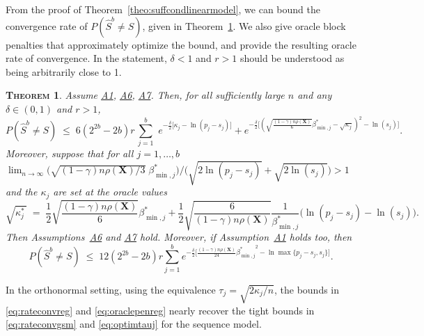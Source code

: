 \documentclass[bj,authoryear]{imsart}
\theoremstyle{plain}
\newtheorem{thm}{\textsc{Theorem}}[section]
\newcommand{\david}[1]{{\small{\color{blue} \sf $\heartsuit$ [David: #1]}}}
\newcommand{\paul}[1]{{\small{\color{green} \sf $\spadesuit$ Paul: #1}}}
\newcommand{\bs}{\boldsymbol}
\begin{document}
From the proof of Theorem~\ref{theo:suffcondlinearmodel}, we can bound the convergence rate of $P(\hat S^{b}\neq S)$, given in Theorem~\ref{prop:fullrecovreg}. We also give oracle block penalties that approximately optimize the bound, and provide the resulting oracle rate of convergence. 
In the statement, $\delta<1$ and $r>1$ should be understood as being arbitrarily close to 1. 
\begin{thm}\label{prop:fullrecovreg}
Assume \hyperlink{lab:A1}{A1}, \hyperlink{lab:A6}{A6}, \hyperlink{lab:A7}{A7}. %
Then, for all sufficiently large $n$ and any $\delta \in (0,1)$ and $r>1$,
\begin{equation}\label{eq:rateconvreg}
 P(\hat{S}^{b} \neq S)\;\leq\; 6(2^{2b}-2b)r\,\sum_{j=1}^b\,\, e^{-\tfrac{\delta}{2}\big[\kappa_j-\ln(p_j-s_j)\big]} + 
    e^{-\tfrac{\delta}{2}\big[(\sqrt{\frac{(1-\gamma) n\rho(\bs X)}{6}}{\beta_{\min,j}^*} - \sqrt{\kappa_j})^2 -\ln(s_j) \big]}.
\end{equation}
Moreover, suppose that for all $j=1,\ldots,b$ $\lim_{n\to \infty}\big(\sqrt{(1-\gamma) n\rho(\bs X)/3}\;\beta_{\min,j}^*\big)/\big(\sqrt{2\ln(p_j-s_j)} + \sqrt{2\ln(s_j)}\big) >1$ and the $\kappa_j$ are set at the oracle values
	\begin{equation} \label{eq:oraclepenreg}
\sqrt{\kappa^*_j\,} \;=\; \frac12\sqrt{\frac{(1-\gamma) n\rho(\bs X)}{6}}{\beta_{\min,j}^*}+\frac12\sqrt{\frac{6}{(1-\gamma) n\rho(\bs X)}}\frac{1}{\beta_{\min,j}^*}\big(\ln({p_j-s_j})-\ln({s_j})\big).
\end{equation}
Then Assumptions~\hyperlink{lab:A6}{A6} and \hyperlink{lab:A7}{A7} hold. Moreover, if Assumption~\hyperlink{lab:A1}{A1} holds too, then
\begin{equation}\label{eq:oraclerateconvreg}
    P(\hat{S}^{b} \neq S) \; \leq \; 12(2^{2b}-2b)r \sum_{j=1}^b e^{-\tfrac{\delta}{2}\big[\frac{(1-\gamma) n\rho(\bs X)}{24}{\beta_{\min,j}^*}^2-\ln \max\{p_j-s_j,s_j\}\big]}.
\end{equation}
\end{thm}
In the orthonormal setting, using the equivalence $\tau_j=\sqrt{2 \kappa_j/n}$, the bounds in \eqref{eq:rateconvreg} and \eqref{eq:oraclepenreg} nearly recover the tight bounds in \eqref{eq:rateconvgsm} and \eqref{eq:optimtauj} for the sequence model. 
\end{document}
